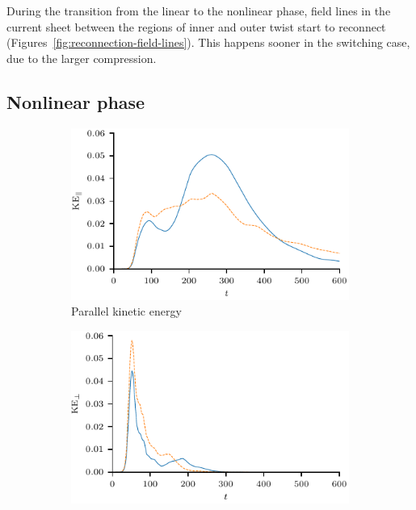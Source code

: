 During the transition from the linear to the nonlinear phase, field lines in the current sheet between the regions of inner and outer twist start to reconnect (Figures~\ref{fig:reconnection-field-lines}). This happens sooner in the switching case, due to the larger compression.

\subsection{Nonlinear phase}

\begin{figure}[t]
    \centering
    \begin{subfigure}[t]{0.49\textwidth}
      \centering
      \includegraphics[width=\linewidth]{parallel_kinetic_energy_over_time.pdf}
      \caption{Parallel kinetic energy}
      \label{fig:parallel_kinetic_energy_over_time}
    \end{subfigure}%
    \begin{subfigure}[t]{0.49\textwidth}
      \centering
      \includegraphics[width=\linewidth]{perp_kinetic_energy_over_time.pdf}

\end{subfigure}
\end{figure}
